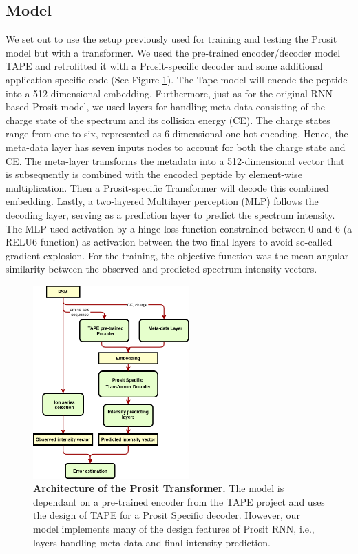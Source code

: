 \documentclass[10pt,a4paper]{article}
\begin{document}
\subsection*{Model}
We set out to use the setup previously used for training and testing the Prosit model but with a transformer. We used the pre-trained encoder/decoder model TAPE \cite{Rao2019-qq} and retrofitted it with a Prosit-specific decoder and some additional application-specific code (See Figure \ref{fig:architecture}). The Tape model will encode the peptide into a 512-dimensional embedding. Furthermore, just as for the original RNN-based Prosit model, we used layers for handling meta-data consisting of the charge state of the spectrum and its collision energy (CE). The charge states range from one to six, represented as 6-dimensional one-hot-encoding. Hence, the meta-data layer has seven inputs nodes to account for both the charge state and CE. The meta-layer transforms the metadata into a 512-dimensional vector that is subsequently is combined with the encoded peptide by element-wise multiplication. Then a Prosit-specific Transformer will decode this combined embedding. Lastly, a two-layered Multilayer perception (MLP) follows the decoding layer, serving as a prediction layer to predict the spectrum intensity. The MLP used activation by a hinge loss function constrained between 0 and 6 (a RELU6 function) as activation between the two final layers to avoid so-called gradient explosion. For the training, the objective function was the mean angular similarity between the observed and predicted spectrum intensity vectors.


\begin{figure}[htb]
\centering
\includegraphics[width=6cm]{./img/architecture.png}
\caption{{\bf Architecture of the Prosit Transformer.} The model is dependant on a pre-trained encoder from the TAPE project and uses the design of TAPE for a Prosit Specific decoder. However, our model implements many of the design features of Prosit RNN, i.e., layers handling meta-data and final intensity prediction. \label{fig:architecture}}
\end{figure}
\end{document}
